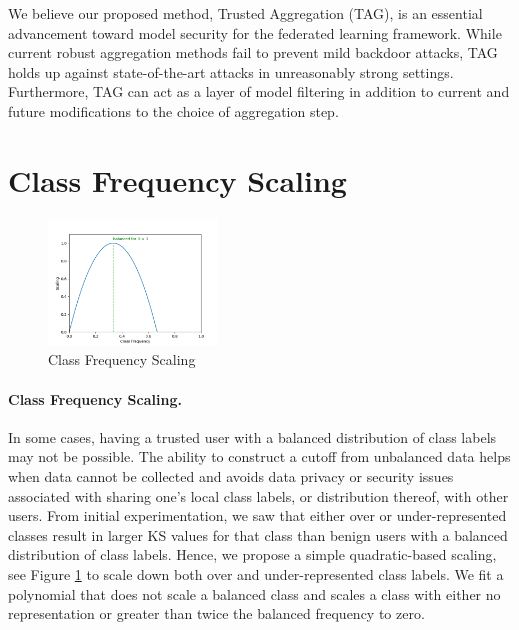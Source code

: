 \documentclass{article} %
\begin{document}
We believe our proposed method, Trusted Aggregation (TAG), is an essential advancement toward model security for the federated learning framework. While current robust aggregation methods fail to prevent mild backdoor attacks, TAG holds up against state-of-the-art attacks in unreasonably strong settings. Furthermore, TAG can act as a layer of model filtering in addition to current and future modifications to the choice of aggregation step.

\newpage
{  \small 


}


%
\pagebreak
\appendix

%
\section{Class Frequency Scaling}

\begin{figure}
    \centering
    \includegraphics[width=0.4\textwidth]{make_article/make_visuals/visuals/scaling.png}
    \caption{Class Frequency Scaling}
    \label{fig:scaling}
\end{figure}

\paragraph{Class Frequency Scaling.} In some cases, having a trusted user with a balanced distribution of class labels may not be possible. The ability to construct a cutoff from unbalanced data helps when data cannot be collected and avoids data privacy or security issues associated with sharing one's local class labels, or distribution thereof, with other users. From initial experimentation, we saw that either over or under-represented classes result in larger KS values for that class than benign users with a balanced distribution of class labels. Hence, we propose a simple quadratic-based scaling, see Figure \ref{fig:scaling} to scale down both over and under-represented class labels. We fit a polynomial that does not scale a balanced class and scales a class with either no representation or greater than twice the balanced frequency to zero.
\end{document}
